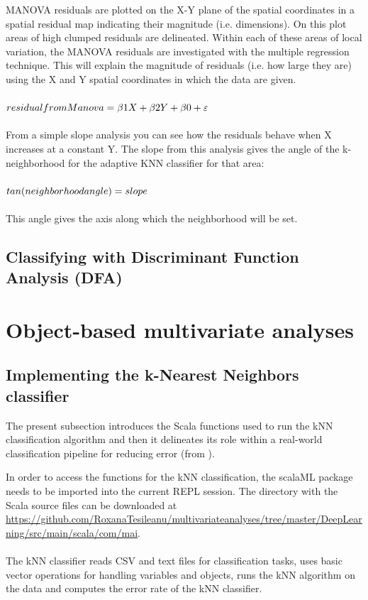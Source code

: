 \documentclass {article}
\begin{document}
MANOVA residuals are plotted on the X-Y plane of the spatial coordinates in a spatial residual map indicating their magnitude (i.e. dimensions). On this plot areas of high clumped residuals are delineated.  
Within each of these areas of local variation, the MANOVA residuals are investigated with the multiple regression technique. This will explain the magnitude of residuals (i.e. how large they are) using the X and Y spatial coordinates in which the data are given.
\\
\\
$residual\underline{\space}from\underline{\space}Manova = \beta1 X + \beta2 Y + \beta0 + \varepsilon$
\\
\\
From a simple slope analysis you can see how the residuals behave when X increases at a constant Y.
 The slope from this analysis gives the angle of the k-neighborhood for the adaptive KNN classifier for that area:
\\
\\
$ tan(neighborhood\underline{\space}angle) = slope $
\\
\\
This angle gives the axis along which the neighborhood will be set.
 

\subsection {Classifying with Discriminant Function Analysis (DFA)}


\section {Object-based multivariate analyses}

\subsection{ Implementing the k-Nearest Neighbors classifier}

The present subsection introduces the Scala functions used to run the kNN classification algorithm and then it delineates its role within a real-world classification pipeline for reducing error (from \cite{tesileanu_introduction_2017}).

In order to access the functions for the kNN classification, the scalaML package needs to be imported into the current REPL session. The directory with the Scala source files can be downloaded at \href{https://github.com/RoxanaTesileanu/multivariate_analyses/tree/master/DeepLearning/src/main/scala/com/mai}{https://github.com/RoxanaTesileanu/multivariate\underline{\space}analyses/tree/master/DeepLearning/src/main/scala/com/mai}.
\\
\\
The kNN classifier reads CSV and text files for classification tasks, uses basic vector operations for handling variables and objects, runs the kNN algorithm on the data and computes the error rate of the kNN classifier.
\end{document}
